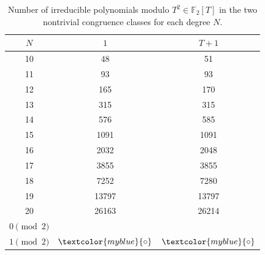 \documentclass[10pt,reqno]{amsproc}
\newcommand{\1}{\mathds{1}}	%
\theoremstyle{definition}
\theoremstyle{remark}
\newcommand{\myb}[1]{\textcolor{myblue}{#1}}
\begin{document}
\begin{table}[h]
\centering
\begin{tabular}{c|cc}
\toprule
{$N$} & {$1$} & {$T+1$}  \\
\midrule
10 & 48 & 51 \\ 
11 & \myb{93} & \myb{93} \\
12 & 165 & 170 \\
13 & \myb{315} & \myb{315} \\
14 & 576 & 585 \\ 
15 & \myb{1091} & \myb{1091} \\ 
16 & 2032 & 2048 \\ 
17 & \myb{3855} & \myb{3855} \\ 
18 & 7252 & 7280 \\
19 & \myb{13797} & \myb{13797} \\
20 & 26163 & 26214 \\ %
\midrule
$0 \pmod{2}$ & & \\
$1 \pmod{2}$ & $\myb{\circ}$ & $\myb{\circ}$ \\
\bottomrule
\end{tabular}%
\caption{Number of irreducible polynomials modulo \(T^2 \in \mathbb{F}_2[T]\) in the two nontrivial congruence classes for each degree $N$.}
\label{tab:p2T2}
\end{table}
\end{document}
